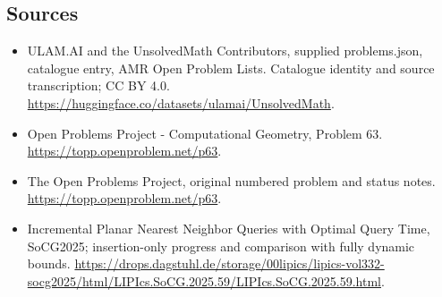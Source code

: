 \documentclass[11pt,a4paper]{article}
\begin{document}
\subsection{Sources}
\begin{itemize}
\item[S1] ULAM.AI and the UnsolvedMath Contributors, supplied problems.json, catalogue entry, AMR Open Problem Lists. Catalogue identity and source transcription; CC BY 4.0.
\url{https://huggingface.co/datasets/ulamai/UnsolvedMath}.
\item[S2] Open Problems Project - Computational Geometry, Problem 63. 
\url{https://topp.openproblem.net/p63}.
\item[S3] The Open Problems Project, original numbered problem and status notes.
\url{https://topp.openproblem.net/p63}.
\item[S4] Incremental Planar Nearest Neighbor Queries with Optimal Query Time, SoCG2025; insertion-only progress and comparison with fully dynamic bounds.
\url{https://drops.dagstuhl.de/storage/00lipics/lipics-vol332-socg2025/html/LIPIcs.SoCG.2025.59/LIPIcs.SoCG.2025.59.html}.
\end{itemize}
\end{document}
